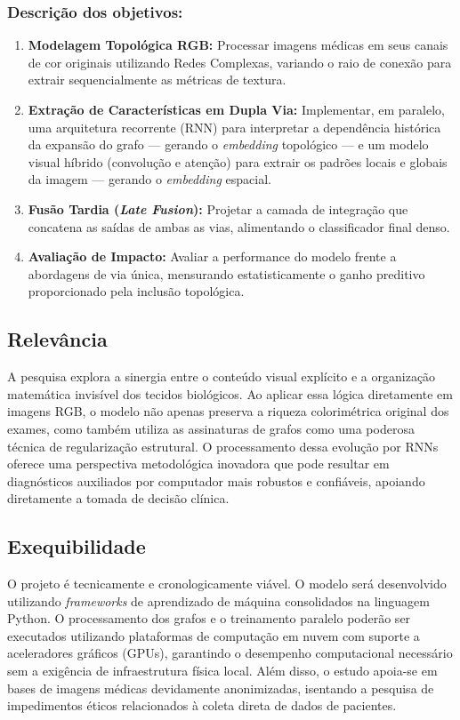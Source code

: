 \documentclass[a4paper,12pt]{article}
\begin{document}
\subsubsection{Descrição dos objetivos:}
\begin{enumerate}
    \item \textbf{Modelagem Topológica RGB:} Processar imagens médicas em seus canais de cor originais utilizando Redes Complexas, variando o raio de conexão para extrair sequencialmente as métricas de textura.
    \item \textbf{Extração de Características em Dupla Via:} Implementar, em paralelo, uma arquitetura recorrente (RNN) para interpretar a dependência histórica da expansão do grafo --- gerando o \textit{embedding} topológico --- e um modelo visual híbrido (convolução e atenção) para extrair os padrões locais e globais da imagem --- gerando o \textit{embedding} espacial.
    \item \textbf{Fusão Tardia (\textit{Late Fusion}):} Projetar a camada de integração que concatena as saídas de ambas as vias, alimentando o classificador final denso.
    \item \textbf{Avaliação de Impacto:} Avaliar a performance do modelo frente a abordagens de via única, mensurando estatisticamente o ganho preditivo proporcionado pela inclusão topológica.
\end{enumerate}

\subsection{Relevância}
A pesquisa explora a sinergia entre o conteúdo visual explícito e a organização matemática invisível dos tecidos biológicos. Ao aplicar essa lógica diretamente em imagens RGB, o modelo não apenas preserva a riqueza colorimétrica original dos exames, como também utiliza as assinaturas de grafos como uma poderosa técnica de regularização estrutural. O processamento dessa evolução por RNNs oferece uma perspectiva metodológica inovadora que pode resultar em diagnósticos auxiliados por computador mais robustos e confiáveis, apoiando diretamente a tomada de decisão clínica.

\subsection{Exequibilidade}
O projeto é tecnicamente e cronologicamente viável. O modelo será desenvolvido utilizando \textit{frameworks} de aprendizado de máquina consolidados na linguagem Python. O processamento dos grafos e o treinamento paralelo poderão ser executados utilizando plataformas de computação em nuvem com suporte a aceleradores gráficos (GPUs), garantindo o desempenho computacional necessário sem a exigência de infraestrutura física local. Além disso, o estudo apoia-se em bases de imagens médicas devidamente anonimizadas, isentando a pesquisa de impedimentos éticos relacionados à coleta direta de dados de pacientes.
\end{document}
